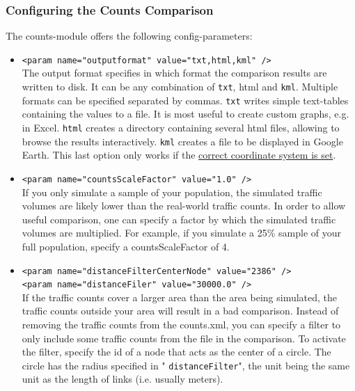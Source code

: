 \subsubsection{Configuring the Counts Comparison}

The counts-module offers the following config-parameters:
\begin{itemize}
	\item 
\texttt{<param name="outputformat" value="txt,html,kml" />}
\\     The output format specifies in which format the comparison results are written to disk. It can be any combination of 
\texttt{txt}, html and 
\texttt{kml}. Multiple formats can be specified separated by commas. 
\texttt{txt} writes simple text-tables containing the values to a file. It is most useful to create custom graphs, e.g. in Excel. 
\texttt{html} creates a directory containing several html files, allowing to browse the results interactively. 
\texttt{kml} creates a file to be displayed in Google Earth. This last option only works if the \href{http://www.matsim.org/node/405}{correct coordinate system is set}.
	\item 
\texttt{<param name="countsScaleFactor" value="1.0" />}
\\     If you only simulate a sample of your population, the simulated  traffic volumes are likely lower than the real-world traffic counts. In  order to allow useful comparison, one can specify a factor by which the  simulated traffic volumes are multiplied. For example, if you simulate a  25\% sample of your full population, specify a countsScaleFactor  of 4.
	\item 
\texttt{<param name="distanceFilterCenterNode" value="2386" />
\\     <param name="distanceFiler" value="30000.0" />}
\\     If the traffic counts cover a larger area than the area being  simulated, the traffic counts outside your area will result in a bad  comparison. Instead of removing the traffic counts from the counts.xml,  you can specify a filter to only include some traffic counts from the  file in the comparison. To activate the filter, specify the id of a node  that acts as the center of a circle. The circle has the radius  specified in "
\texttt{distanceFilter}", the unit being the same unit as the length of links (i.e. usually meters).
\end{itemize}



\umbruch
